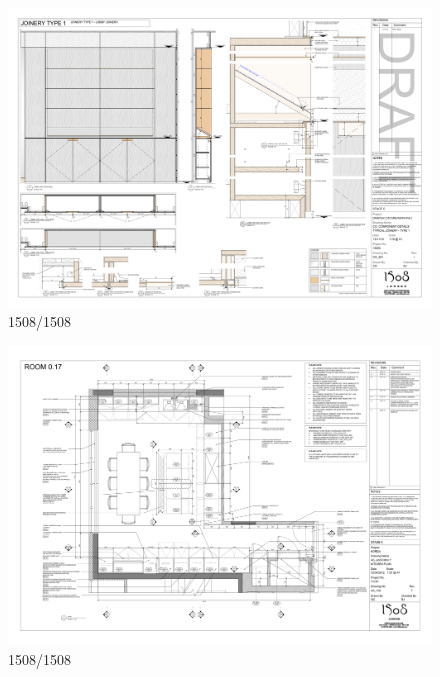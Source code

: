 \documentclass[
]{article}
\begin{document}
\begin{figure}[H]

{\centering \includegraphics{assets/1508/Typical-Joinery-Type-1.png}

}

\caption{1508/1508}

\end{figure}%
\begin{figure}[H]

{\centering \includegraphics{assets/1508/1508-Kitchen-Plan.png}

}

\caption{1508/1508}

\end{figure}%
\end{document}
